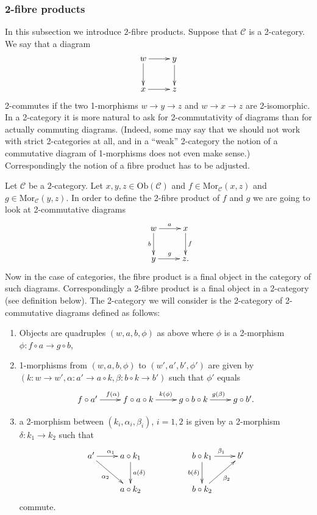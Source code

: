 \documentclass{amsart}
\theoremstyle{definition}
\theoremstyle{remark}
\numberwithin{equation}{subsection}
\begin{document}
\subsubsection{2-fibre products}
\label{subsubsection-2-fibre-products}

\noindent
In this subsection we introduce $2$-fibre products. Suppose that $\mathcal{C}$
is a 2-category. We say that a diagram
$$
\xymatrix{
w \ar[r] \ar[d] & y \ar[d] \\
x \ar[r] & z }
$$
2-commutes if the two 1-morphisms $w \to y \to z$ and $w \to x \to z$ are
2-isomorphic. In a 2-category it is more natural to ask for 2-commutativity 
of diagrams than for actually commuting diagrams. (Indeed, some may say that
we should not work with strict 2-categories at all, and in a ``weak''
2-category the notion of a commutative diagram of 1-morphisms does not even
make sense.) Correspondingly the notion of a fibre product has to be adjusted.

\smallskip\noindent
Let $\mathcal{C}$ be a $2$-category. Let $x,y,z\in \text{Ob}(\mathcal{C})$ and
$f\in \text{Mor}_{\mathcal{C}}(x,z)$ and $g\in \text{Mor}_{\mathcal C}(y,z)$.
In order to define the 2-fibre product of $f$ and $g$ we are going to look at
2-commutative diagrams
$$
\xymatrix{
&w \ar[r]^{a} \ar[d]_{b} & x \ar[d]^{f} \\
&y \ar[r]^{g} & z. }
$$
Now in the case of categories, the fibre product is a final object in the
category of such diagrams. Correspondingly a 2-fibre product is a final object
in a 2-category (see definition below). The 2-category we will consider is
the 2-category of 2-commutative diagrams defined as follows:
\begin{enumerate}
\item Objects are quadruples $(w,a,b,\phi)$ as above where $\phi$
is a 2-morphism $\phi : f \circ a \to g \circ b$, 
\item 1-morphisms from $(w,a,b,\phi)$ to $(w',a',b',\phi')$
are given by $(k : w \to w', \alpha : a' \to a \circ k,
\beta : b \circ k \to b')$ such that $\phi'$ equals 
$$
\xymatrix{
f \circ a' \ar[r]^{f(\alpha)} &
f \circ a \circ k \ar[r]^{k(\phi)} &
g \circ b \circ k \ar[r]^{g(\beta)} &
g \circ b'. }
$$
\item a 2-morphism between $(k_i, \alpha_i, \beta_i)$, $i=1,2$ is given
by a 2-morphism $\delta : k_1 \to k_2$ such that 
$$
\xymatrix{
a' \ar[rd]_{\alpha_2} \ar[r]^{\alpha_1} & 
a \circ k_1 \ar[d]^{a(\delta)} &
&
b \circ k_1 \ar[r]^{\beta_1} \ar[d]_{b(\delta)} &
b'
\\
&
a \circ k_2 &
&
b \circ k_2 \ar[ru]_{\beta_2}
&
}
$$
commute.
\end{enumerate}
\end{document}
